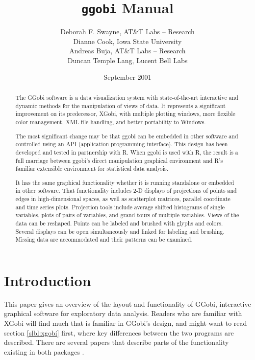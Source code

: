 \documentclass[11pt]{article}
\begin{document}
\title {{\tt ggobi} Manual}
\author{
Deborah F. Swayne, AT\&T Labs -- Research \\
Dianne Cook, Iowa State University \\
Andreas Buja, AT\&T Labs -- Research \\
Duncan Temple Lang, Lucent Bell Labs
}

\date{September 2001}

\maketitle

\begin{abstract}

The GGobi software is a data visualization system with state-of-the-art
interactive and dynamic methods for the manipulation of views of
data.  It represents a significant improvement on its predecessor, XGobi,
with multiple plotting windows, more flexible color management, XML file
handling, and better portability to Windows.

The most significant change may be that ggobi can be embedded in other
software and controlled using an API (application programming
interface).  This design has been developed and tested in partnership
with R.  When ggobi is used with R, the result is a full marriage
between ggobi's direct manipulation graphical environment and R's
familiar extensible environment for statistical data analysis.

It has the same graphical functionality whether it is running
standalone or embedded in other software.  That functionality
includes 2-D displays of projections of points and edges in
high-dimensional spaces, as well as scatterplot matrices, parallel
coordinate and time series plots.  Projection tools include average
shifted histograms of single variables, plots of pairs of variables,
and grand tours of multiple variables.  Views of the data can be
reshaped.  Points can be labeled and brushed with glyphs and colors.
Several displays can be open simultaneously and linked for labeling
and brushing.  Missing data are accommodated and their patterns can
be examined.
\end{abstract}

\section{Introduction}

This paper gives an overview of the layout and functionality of GGobi,
interactive graphical software for exploratory data analysis.  Readers
who are familiar with XGobi will find much that is familiar in GGobi's
design, and might want to read section \ref{slbl:xgobi} first, where
key differences between the two programs are described. There are
several papers that describe parts of the functionality existing in
both packages
\cite{BCS95,SCB97,SB98,BAHM88,CBC93,CBCH95,CB95,BCAH95c}.
\end{document}
